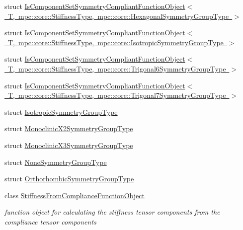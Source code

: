 \begin{DoxyCompactItemize}
\item 
struct \mbox{\hyperlink{structmpc_1_1core_1_1_is_component_set_symmetry_compliant_function_object_3_01_t_00_01mpc_1_1cor759b7c69972a7dcf59bf7ae608e4a92c}{Is\+Component\+Set\+Symmetry\+Compliant\+Function\+Object$<$ T, mpc\+::core\+::\+Stiffness\+Type, mpc\+::core\+::\+Hexagonal\+Symmetry\+Group\+Type $>$}}
\item 
struct \mbox{\hyperlink{structmpc_1_1core_1_1_is_component_set_symmetry_compliant_function_object_3_01_t_00_01mpc_1_1cor5b3c621b09cb8374deb901704b4d0284}{Is\+Component\+Set\+Symmetry\+Compliant\+Function\+Object$<$ T, mpc\+::core\+::\+Stiffness\+Type, mpc\+::core\+::\+Isotropic\+Symmetry\+Group\+Type $>$}}
\item 
struct \mbox{\hyperlink{structmpc_1_1core_1_1_is_component_set_symmetry_compliant_function_object_3_01_t_00_01mpc_1_1cor18824c2f208577845d220d91137aad1b}{Is\+Component\+Set\+Symmetry\+Compliant\+Function\+Object$<$ T, mpc\+::core\+::\+Stiffness\+Type, mpc\+::core\+::\+Trigonal6\+Symmetry\+Group\+Type $>$}}
\item 
struct \mbox{\hyperlink{structmpc_1_1core_1_1_is_component_set_symmetry_compliant_function_object_3_01_t_00_01mpc_1_1corbe0c5d4e21105c144a825f64d1e00184}{Is\+Component\+Set\+Symmetry\+Compliant\+Function\+Object$<$ T, mpc\+::core\+::\+Stiffness\+Type, mpc\+::core\+::\+Trigonal7\+Symmetry\+Group\+Type $>$}}
\item 
struct \mbox{\hyperlink{structmpc_1_1core_1_1_isotropic_symmetry_group_type}{Isotropic\+Symmetry\+Group\+Type}}
\item 
struct \mbox{\hyperlink{structmpc_1_1core_1_1_monoclinic_x2_symmetry_group_type}{Monoclinic\+X2\+Symmetry\+Group\+Type}}
\item 
struct \mbox{\hyperlink{structmpc_1_1core_1_1_monoclinic_x3_symmetry_group_type}{Monoclinic\+X3\+Symmetry\+Group\+Type}}
\item 
struct \mbox{\hyperlink{structmpc_1_1core_1_1_none_symmetry_group_type}{None\+Symmetry\+Group\+Type}}
\item 
struct \mbox{\hyperlink{structmpc_1_1core_1_1_orthorhombic_symmetry_group_type}{Orthorhombic\+Symmetry\+Group\+Type}}
\item 
class \mbox{\hyperlink{structmpc_1_1core_1_1_stiffness_from_compliance_function_object}{Stiffness\+From\+Compliance\+Function\+Object}}
\begin{DoxyCompactList}\small\item\em function object for calculating the stiffness tensor components from the compliance tensor components \end{DoxyCompactList}\item 

\end{DoxyCompactItemize}
